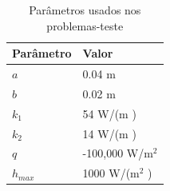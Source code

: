 \documentclass{beamer}
\begin{document}
\begin{frame}
	\begin{table}[H]
		\centering
		\caption{Parâmetros usados nos problemas-teste}
		\begin{tabular}{|l|l|}
			\hline
			\textbf{Parâmetro} & \textbf{Valor}  \\ \hline
			$a$       & 0.04 m   \\ \hline
			$b$       & 0.02 m     \\ \hline
			$k_1$     & 54 W/(m \celsius)  \\ \hline
			$k_2$     & 14 W/(m \celsius) \\ \hline
			$q$       & -100,000 W/$\text{m}^2$ \\ \hline
			$h_{max}$       & 1000 W/($\text{m}^2$ \celsius) \\ \hline
		\end{tabular}		
		\label{tabela_params}
	\end{table}
\end{frame}

	
\end{document}
